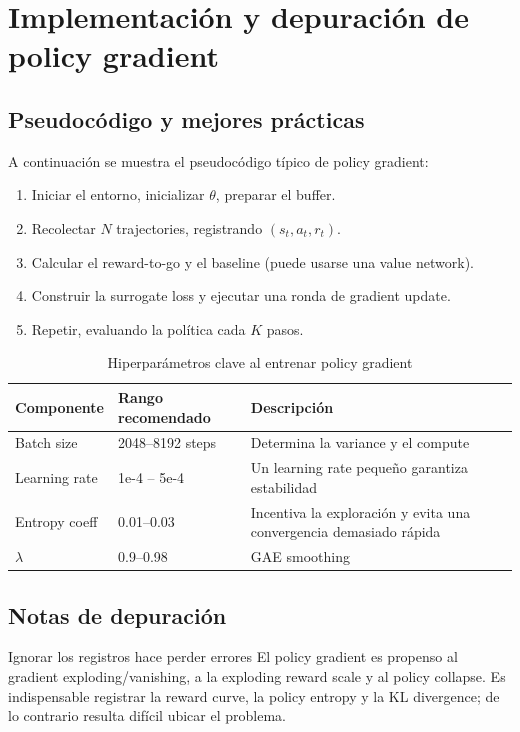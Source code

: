 \section{Implementación y depuración de policy gradient}
\subsection{Pseudocódigo y mejores prácticas}
A continuación se muestra el pseudocódigo típico de policy gradient:
\begin{enumerate}
    \item Iniciar el entorno, inicializar $\theta$, preparar el buffer.
    \item Recolectar $N$ trajectories, registrando $(s_t,a_t,r_t)$.
    \item Calcular el reward-to-go y el baseline (puede usarse una value network).
    \item Construir la surrogate loss y ejecutar una ronda de gradient update.
    \item Repetir, evaluando la política cada $K$ pasos.
\end{enumerate}

\begin{table}[H]
\centering
\small
\begin{tabular}{p{}p{}p{}}
\toprule
Componente & Rango recomendado & Descripción \\
\midrule
Batch size & 2048--8192 steps & Determina la variance y el compute \\
Learning rate & 1e-4 -- 5e-4 & Un learning rate pequeño garantiza estabilidad \\
Entropy coeff & 0.01--0.03 & Incentiva la exploración y evita una convergencia demasiado rápida \\
$\lambda$ & 0.9--0.98 & GAE smoothing \\
\bottomrule
\end{tabular}
\caption{Hiperparámetros clave al entrenar policy gradient}
\end{table}

\subsection{Notas de depuración}
\begin{warningbox}{Ignorar los registros hace perder errores}
El policy gradient es propenso al gradient exploding/vanishing, a la exploding reward scale y al policy collapse. Es indispensable registrar la reward curve, la policy entropy y la KL divergence; de lo contrario resulta difícil ubicar el problema.
\end{warningbox}

